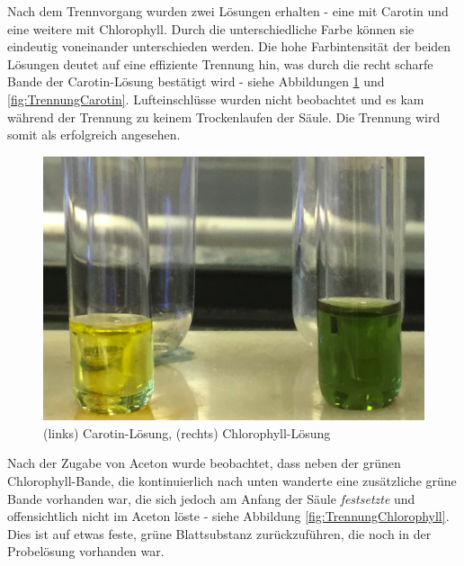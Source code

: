 \documentclass{article}
\begin{document}
      Nach dem Trennvorgang wurden zwei Lösungen erhalten - eine mit Carotin und eine weitere mit Chlorophyll. Durch die unterschiedliche Farbe können sie eindeutig voneinander unterschieden werden. Die hohe Farbintensität der beiden Lösungen deutet auf eine effiziente Trennung hin, was durch die recht scharfe Bande der Carotin-Lösung bestätigt wird - siehe Abbildungen \ref{fig:LosungenCarotin} und \ref{fig:TrennungCarotin}. Lufteinschlüsse wurden nicht beobachtet und es kam während der Trennung zu keinem Trockenlaufen der Säule. Die Trennung wird somit als erfolgreich angesehen.
      
      \begin{figure}[H]
        \includegraphics[scale=0.25, center]{Graphiken/Versuchsanordnungen/LosungenSubstanzen.png} 
        \caption[gesammelten Eluenten der Säulenchromatographie, Quelle: Autor]{(links) Carotin-Lösung, (rechts) Chlorophyll-Lösung}
        \label{fig:LosungenCarotin}
      \end{figure}
      
      Nach der Zugabe von Aceton wurde beobachtet, dass neben der grünen Chlorophyll-Bande, die kontinuierlich nach unten wanderte eine zusätzliche grüne Bande vorhanden war, die sich jedoch am Anfang der Säule \textit{festsetzte} und offensichtlich nicht im Aceton löste - siehe Abbildung \ref{fig:TrennungChlorophyll}. Dies ist auf etwas feste, grüne Blattsubstanz zurückzuführen, die noch in der Probelösung vorhanden war. 
      
\end{document}
